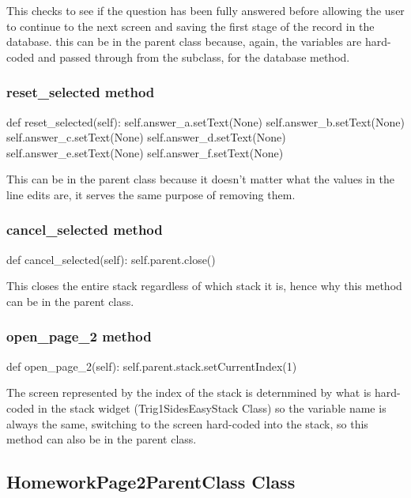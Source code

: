 This checks to see if the question has been fully answered before allowing the user to continue to the next screen and saving the first stage of the record in the database. this can be in the parent class because, again, the variables are hard-coded and passed through from the subclass, for the database method.

\subsubsection{reset\_selected method}

\begin{python}
def reset_selected(self):
        self.answer_a.setText(None)
        self.answer_b.setText(None)
        self.answer_c.setText(None)
        self.answer_d.setText(None)
        self.answer_e.setText(None)
        self.answer_f.setText(None)
\end{python}

This can be in the parent class because it doesn't matter what the values in the line edits are, it serves the same purpose of removing them.

\subsubsection{cancel\_selected method}

\begin{python}
def cancel_selected(self):
        self.parent.close()
\end{python}

This closes the entire stack regardless of which stack it is, hence why this method can be in the parent class.

\subsubsection{open\_page\_2 method}

\begin{python}
def open_page_2(self):
        self.parent.stack.setCurrentIndex(1)
\end{python}

The screen represented by the index of the stack is deternmined by what is hard-coded in the stack widget (Trig1SidesEasyStack Class) so the variable name is always the same, switching to the screen hard-coded into the stack, so this method can also be in the parent class.

\subsection{HomeworkPage2ParentClass Class}

